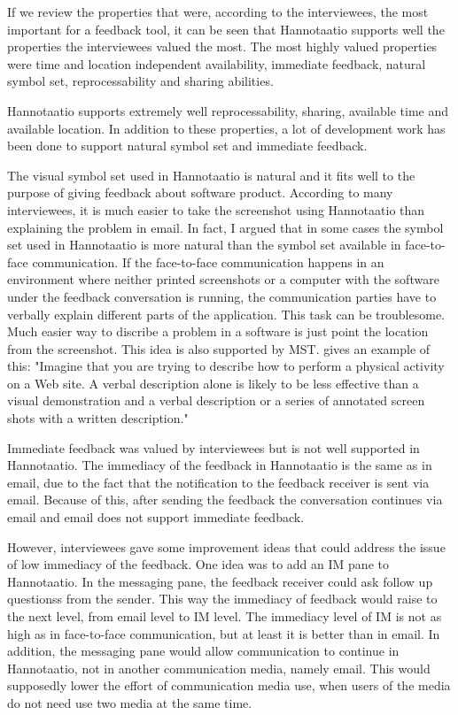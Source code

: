 \documentclass[english,12pt,a4paper,pdftex]{article}
\begin{document}
If we review the properties that were, according to the interviewees, the most important for a feedback tool, it can be seen that Hannotaatio supports well the properties the interviewees valued the most. The most highly valued properties were time and location independent availability, immediate feedback, natural symbol set, reprocessability and sharing abilities. 

Hannotaatio supports extremely well reprocessability, sharing, available time and available location. In addition to these properties, a lot of development work has been done to support natural symbol set and immediate feedback. 

The visual symbol set used in Hannotaatio is natural and it fits well to the purpose of giving feedback about software product. According to many interviewees, it is much easier to take the screenshot using Hannotaatio than explaining the problem in email. In fact, I argued that in some cases the symbol set used in Hannotaatio is more natural than the symbol set available in face-to-face communication. If the face-to-face communication happens in an environment where neither printed screenshots or a computer with the software under the feedback conversation is running, the communication parties have to verbally explain different parts of the application. This task can be troublesome. Much easier way to discribe a problem in a software is just point the location from the screenshot. This idea is also supported by \ac{MST}. \citet{dennis2008} gives an example of this: "Imagine that you are trying to describe how to perform a physical activity on a Web site. A verbal description alone is likely to be less effective than a visual demonstration and a verbal description or a series of annotated screen shots with a written description."

Immediate feedback was valued by interviewees but is not well supported in Hannotaatio. The immediacy of the feedback in Hannotaatio is the same as in email, due to the fact that the notification to the feedback receiver is sent via email. Because of this, after sending the feedback the conversation continues via email and email does not support immediate feedback.

However, interviewees gave some improvement ideas that could address the issue of low immediacy of the feedback. One idea was to add an \acl{IM} pane to Hannotaatio. In the messaging pane, the feedback receiver could ask follow up questionss from the sender. This way the immediacy of feedback would raise to the next level, from email level to \ac{IM} level. The immediacy level of \ac{IM} is not as high as in face-to-face communication, but at least it is better than in email. In addition, the messaging pane would allow communication to continue in Hannotaatio, not in another communication media, namely email. This would supposedly lower the effort of communication media use, when users of the media do not need use two media at the same time.
\end{document}
